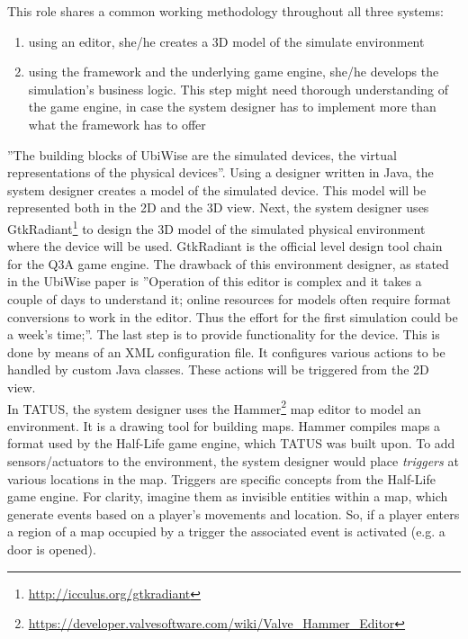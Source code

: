 This role shares a common working methodology throughout all three systems:
\begin{enumerate}
	\item using an editor, she/he creates a 3D model of the simulate environment
	\item using the framework and the underlying game engine, she/he develops the simulation's business logic. This step might need thorough understanding of the game engine, in case the system designer has to implement more than what the framework has to offer
\end{enumerate}

''The building blocks of UbiWise are the simulated devices, the virtual representations of the physical devices''\cite{barton2003ubiwise}. Using a designer written in Java, the system designer creates a model of the simulated device. This model will be represented both in the 2D and the 3D view. Next, the system designer uses GtkRadiant\footnote{\url{http://icculus.org/gtkradiant}} to design the 3D model of the simulated physical environment where the device will be used. GtkRadiant is the official level design tool chain for the Q3A game engine. The drawback of this environment designer, as stated in the UbiWise paper is ''Operation of this editor is complex and it takes a couple of days to understand it; online resources for models often require format conversions to work in the editor. Thus the effort for the first simulation could be a week's time;''\cite{barton2003ubiwise}. The last step is to provide functionality for the device. This is done by means of an XML configuration file. It configures various actions to be handled by custom Java classes. These actions will be triggered from the 2D view.\\

In TATUS, the system designer uses the Hammer\footnote{\url{https://developer.valvesoftware.com/wiki/Valve_Hammer_Editor}} map editor to model an environment. It is a drawing tool for building maps. Hammer compiles maps a format used by the Half-Life game engine, which TATUS was built upon. To add sensors/actuators to the environment, the system designer would place \emph{triggers} at various locations in the map. Triggers are specific concepts from the Half-Life game engine. For clarity, imagine them as invisible entities within a map, which generate events based on a player's movements and location. So, if a player enters a region of a map occupied by a trigger the associated event is activated (e.g. a door is opened).\\

